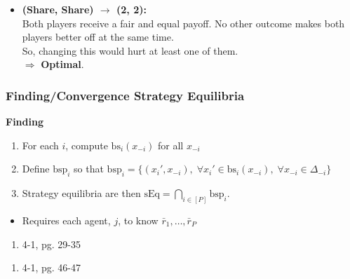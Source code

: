 \begin{example}
\begin{enumerate}
\begin{enumerate}
\begin{itemize}
                \item \textbf{(Share, Share) $\rightarrow$ (2, 2):} \\
                Both players receive a fair and equal payoff. No other outcome makes both players better off at the same time. \\
                So, changing this would hurt at least one of them. \\
                $\Rightarrow$ \textbf{Optimal}.
            \end{itemize}                                 
        \end{enumerate}
    \end{enumerate}
\end{example}
\newpage

\subsubsection{Finding/Convergence Strategy Equilibria}
\begin{process} \textbf{Finding}
    \begin{enumerate}
        \item For each $i$, compute $\text{bs}_i (x_{-i})$ for all $x_{-i}$
        \item Define $\text{bsp}_i$ so that $\text{bsp}_i = \{(x_i',x_{-i}), \; \forall x_i' \in \text{bs}_i (x_{-i}), \; \forall x_{-i} \in \Delta_{-i}\}$
        \item Strategy equilibria are then $\text{sEq} = \bigcap_{i\in [P]} \text{bsp}_i$.
    \end{enumerate}
    \begin{itemize}
        \item Requires each agent, $j$, to know $\bar{r}_1,\ldots,\bar{r}_P$
    \end{itemize}
\end{process}
\newpage

\begin{example}
    \begin{enumerate}
        \item 4-1, pg. 29-35
    \end{enumerate}
\end{example}

\begin{example}
    \begin{enumerate}
        \item 4-1, pg. 46-47
    \end{enumerate}
\end{example}

